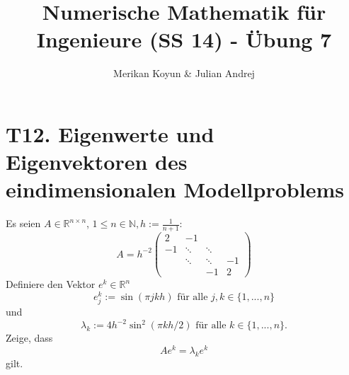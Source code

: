 \documentclass[11pt]{article}
\theoremstyle{plain}
\theoremstyle{definition}
\renewcommand{\u}{\"{u}}
\begin{document}
\title{Numerische Mathematik f\u r Ingenieure (SS 14) - \"{U}bung 7}
\author{Merikan Koyun \& Julian Andrej}
\maketitle

\section*{T12. Eigenwerte und Eigenvektoren des eindimensionalen Modellproblems}
Es seien $A \in \mathbb{R}^{n \times n}$, $1 \leq n \in \mathbb{N}, h := \frac{1}{n+1}$:
\begin{equation}
A=h^{-2}
\begin{pmatrix}
2 & -1 & & \\
-1 & \ddots & \ddots & \\
 & \ddots & \ddots & -1 \\
 & & -1 & 2 
\end{pmatrix}
\end{equation}
Definiere den Vektor $e^k \in \mathbb{R}^n$
\begin{equation}
e^k_j := \sin(\pi jkh) \text{ f\u r alle } j,k\in \{1,...,n\}
\end{equation}
und
\begin{equation}
\lambda_k := 4h^{-2} \sin^2(\pi kh/2) \text{ f\u r alle } k\in \{1,...,n\} .
\end{equation}
Zeige, dass
\begin{equation}
Ae^k = \lambda_ke^k
\end{equation}
gilt.\vspace{0.2cm}
\end{document}
